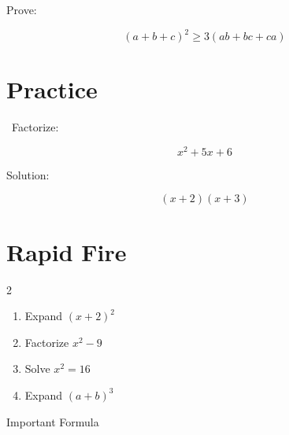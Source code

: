 
\begin{olympiadbox}

Prove:

\[
(a+b+c)^2\ge 3(ab+bc+ca)
\]

\end{olympiadbox}


\section{Practice}

\begin{problem}

\faStar\ Factorize:

\[
x^2+5x+6
\]

Solution:

\[
(x+2)(x+3)
\]

\end{problem}


\section{Rapid Fire}

\begin{multicols}{2}

\begin{enumerate}

\item Expand $(x+2)^2$
\item Factorize $x^2-9$
\item Solve $x^2=16$
\item Expand $(a+b)^3$

\end{enumerate}

\end{multicols}


Important Formula

